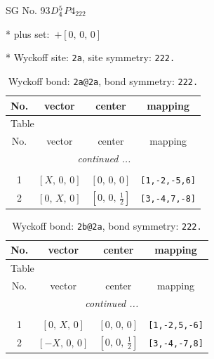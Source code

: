 \documentclass[fleqn,8pt]{jsarticle}
\begin{document}
\setcounter{MaxMatrixCols}{32}

\renewcommand{\tablename}{Table~}
\renewcommand{\figurename}{Figure~}
\begin{center}
\LARGE
SG No. 93\quad$D_{\rm 4}^{5}$\quad$P4_222$\quad[ tetragonal ]
\end{center}

* plus set:\,\,\,$+\left[ 0,\, 0,\, 0 \right]$


* Wyckoff site: {\tt 2a}, site symmetry: {\tt 222.}
\renewcommand{\arraystretch}{1.2}
\begin{longtable}{cccc}
\caption{Wyckoff bond: {\tt 2a@2a}, bond symmetry: {\tt 222.}}
 \\
 \hline \hline
No. & vector & center & mapping \\ \hline \endfirsthead

\multicolumn{3}{l}{\tablename\ \thetable{}} \\
 \hline \hline
No. & vector & center & mapping \\ \hline \endhead

 \hline \hline
\multicolumn{3}{r}{\footnotesize\it continued ...} \\ \endfoot

 \hline \hline
\multicolumn{3}{r}{} \\ \endlastfoot

1 & $\left[ X,\, 0,\, 0 \right]$ & $\left[ 0,\, 0,\, 0 \right]$ & {\tt [1,-2,-5,6]} \\ \hline
2 & $\left[ 0,\, X,\, 0 \right]$ & $\left[ 0,\, 0,\, \frac{1}{2} \right]$ & {\tt [3,-4,7,-8]} \\
\end{longtable}
\renewcommand{\arraystretch}{1.2}
\begin{longtable}{cccc}
\caption{Wyckoff bond: {\tt 2b@2a}, bond symmetry: {\tt 222.}}
 \\
 \hline \hline
No. & vector & center & mapping \\ \hline \endfirsthead

\multicolumn{3}{l}{\tablename\ \thetable{}} \\
 \hline \hline
No. & vector & center & mapping \\ \hline \endhead

 \hline \hline
\multicolumn{3}{r}{\footnotesize\it continued ...} \\ \endfoot

 \hline \hline
\multicolumn{3}{r}{} \\ \endlastfoot

1 & $\left[ 0,\, X,\, 0 \right]$ & $\left[ 0,\, 0,\, 0 \right]$ & {\tt [1,-2,5,-6]} \\ \hline
2 & $\left[ - X,\, 0,\, 0 \right]$ & $\left[ 0,\, 0,\, \frac{1}{2} \right]$ & {\tt [3,-4,-7,8]} \\
\end{longtable}
\end{document}
